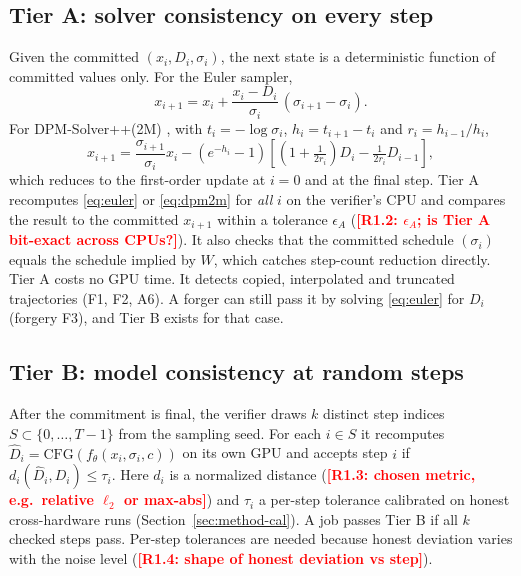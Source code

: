 \documentclass[preprint,review,12pt,authoryear]{elsarticle}
\newcommand{\res}[1]{\textcolor{red}{\textbf{[#1]}}}          %
\theoremstyle{definition}
\begin{document}
\subsection{Tier A: solver consistency on every step}
Given the committed $(x_i,D_i,\sigma_i)$, the next state is a deterministic function of committed values only. For the Euler sampler,
\begin{equation}
x_{i+1}=x_i+\frac{x_i-D_i}{\sigma_i}\,(\sigma_{i+1}-\sigma_i). \label{eq:euler}
\end{equation}
For DPM-Solver++(2M) \citep{lu2022dpmsolverpp}, with $t_i=-\log\sigma_i$, $h_i=t_{i+1}-t_i$ and $r_i=h_{i-1}/h_i$,
\begin{equation}
x_{i+1}=\frac{\sigma_{i+1}}{\sigma_i}x_i-\left(e^{-h_i}-1\right)\left[\left(1+\tfrac{1}{2r_i}\right)D_i-\tfrac{1}{2r_i}D_{i-1}\right], \label{eq:dpm2m}
\end{equation}
which reduces to the first-order update at $i=0$ and at the final step. Tier A recomputes \eqref{eq:euler} or \eqref{eq:dpm2m} for \emph{all} $i$ on the verifier's CPU and compares the result to the committed $x_{i+1}$ within a tolerance $\epsilon_A$ (\res{R1.2: $\epsilon_A$; is Tier A bit-exact across CPUs?}). It also checks that the committed schedule $(\sigma_i)$ equals the schedule implied by $W$, which catches step-count reduction directly. Tier A costs no GPU time. It detects copied, interpolated and truncated trajectories (F1, F2, A6). A forger can still pass it by solving \eqref{eq:euler} for $D_i$ (forgery F3), and Tier B exists for that case.

\subsection{Tier B: model consistency at random steps}
After the commitment is final, the verifier draws $k$ distinct step indices $S\subset\{0,\dots,T-1\}$ from the sampling seed. For each $i\in S$ it recomputes $\hat D_i=\mathrm{CFG}(f_\theta(x_i,\sigma_i,c))$ on its own GPU and accepts step $i$ if $d_i(\hat D_i,D_i)\le\tau_i$. Here $d_i$ is a normalized distance (\res{R1.3: chosen metric, e.g.\ relative $\ell_2$ or max-abs}) and $\tau_i$ a per-step tolerance calibrated on honest cross-hardware runs (Section~\ref{sec:method-cal}). A job passes Tier B if all $k$ checked steps pass. Per-step tolerances are needed because honest deviation varies with the noise level (\res{R1.4: shape of honest deviation vs step}).
\end{document}
